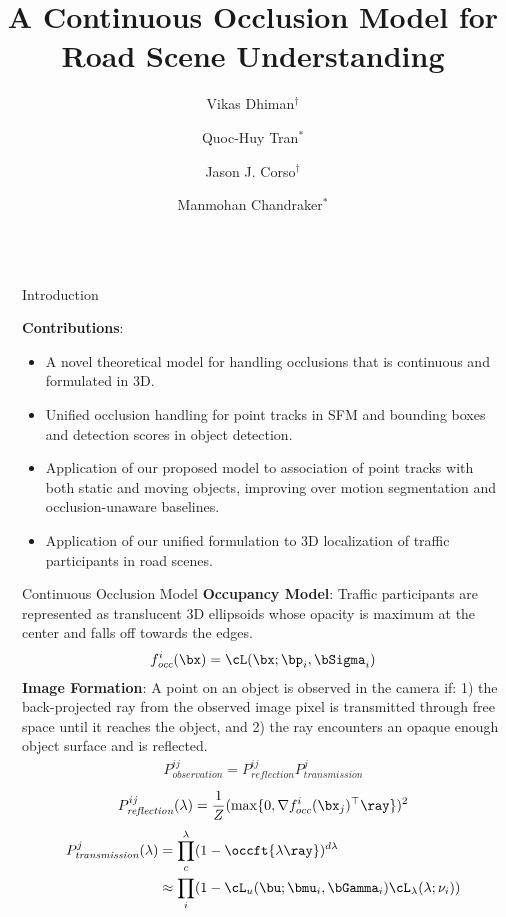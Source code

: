 \documentclass[handout,final]{beamer}
\title{A Continuous Occlusion Model for Road Scene Understanding}
\author{Vikas Dhiman$^\dagger$ \and Quoc-Huy Tran$^*$ \and Jason J. Corso$^\dagger$ \and Manmohan Chandraker$^*$}
\institute{$^\dagger$University of Michigan, Ann Arbor, MI \qquad $^*$NEC Laboratories America, Cupertino, CA}
\newcommand{\meandepth}[1]{\nu_#1}
\newlength{\sepwid}
\newlength{\onecolwid}
\begin{document}
\begin{frame}[t]
  \begin{columns}[t]												%
    \begin{column}{\sepwid}\end{column}			%
    \begin{column}{\onecolwid}
      \begin{block}{Introduction}
        \begin{figure}[!!t]
          
        \end{figure}
        \textbf{Contributions}:
        \begin{itemize}
		  \item A novel theoretical model for handling occlusions that is continuous and formulated in 3D.
		  \item Unified occlusion handling for point tracks in SFM and bounding boxes and detection scores in object detection.
		  \item Application of our proposed model to association of point tracks with both static and moving objects, improving over motion segmentation and occlusion-unaware baselines.
		  \item Application of our unified formulation to 3D localization of traffic participants in road scenes.
		\end{itemize}
      \end{block}

      \begin{block}{Continuous Occlusion Model}
		\textbf{Occupancy Model}: Traffic participants are represented as translucent 3D ellipsoids whose opacity is maximum at the center and falls off towards the edges.
        \begin{align}
          f^i_{\textit{occ}}(\bx) = \cL(\bx; \bp_i, \bSigma_i)
        \end{align}
		\textbf{Image Formation}: A point on an object is observed in the camera if: 1) the back-projected ray from the observed image pixel is transmitted through free space until it reaches the object, and 2) the ray encounters an opaque enough object surface and is reflected.		
        \begin{align}
          P^{ij}_{\textit{observation}} = P^{ij}_{\textit{reflection}}P^{j}_{\textit{transmission}}
        \end{align}
        \begin{align}
          P^{ij}_{\textit{reflection}}(\lambda) = \frac{1}{Z}(\max \{0, \nabla {f^i_{occ}}(\bx_j)^\top \ray \})^2
        \end{align}
        \begin{align}
          P^{j}_{\textit{transmission}}(\lambda) &= \prod_{c}^{\lambda} (1 - \occft{\lambda \ray})^{d\lambda}\\
          &\approx \prod_i (1 - \cL_u (\bu; \bmu_i, \bGamma_i) \cL_{\lambda}(\lambda; \meandepth{i}))
        \end{align}


\end{block}
\end{column}
\end{columns}
\end{frame}
\end{document}
